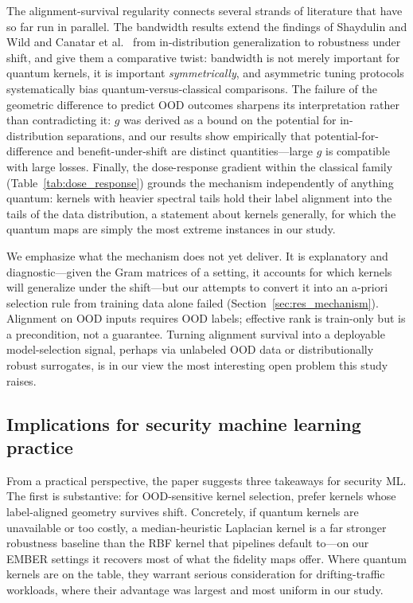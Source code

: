 \documentclass[journal]{IEEEtran}
\begin{document}
The alignment-survival regularity connects several strands of literature that have so far run in parallel. The bandwidth results extend the findings of Shaydulin and Wild \cite{shaydulin2022bandwidth} and Canatar et al.\ \cite{canatar2023bandwidth} from in-distribution generalization to robustness under shift, and give them a comparative twist: bandwidth is not merely important for quantum kernels, it is important \emph{symmetrically}, and asymmetric tuning protocols systematically bias quantum-versus-classical comparisons. The failure of the geometric difference \cite{huang2021powerofdata} to predict OOD outcomes sharpens its interpretation rather than contradicting it: $g$ was derived as a bound on the potential for in-distribution separations, and our results show empirically that potential-for-difference and benefit-under-shift are distinct quantities---large $g$ is compatible with large losses. Finally, the dose-response gradient within the classical family (Table~\ref{tab:dose_response}) grounds the mechanism independently of anything quantum: kernels with heavier spectral tails hold their label alignment into the tails of the data distribution, a statement about kernels generally, for which the quantum maps are simply the most extreme instances in our study.

We emphasize what the mechanism does not yet deliver. It is explanatory and diagnostic---given the Gram matrices of a setting, it accounts for which kernels will generalize under the shift---but our attempts to convert it into an a-priori selection rule from training data alone failed (Section~\ref{sec:res_mechanism}). Alignment on OOD inputs requires OOD labels; effective rank is train-only but is a precondition, not a guarantee. Turning alignment survival into a deployable model-selection signal, perhaps via unlabeled OOD data or distributionally robust surrogates, is in our view the most interesting open problem this study raises.

\subsection{Implications for security machine learning practice}

From a practical perspective, the paper suggests three takeaways for security ML. The first is substantive: for OOD-sensitive kernel selection, prefer kernels whose label-aligned geometry survives shift. Concretely, if quantum kernels are unavailable or too costly, a median-heuristic Laplacian kernel is a far stronger robustness baseline than the RBF kernel that pipelines default to---on our EMBER settings it recovers most of what the fidelity maps offer. Where quantum kernels are on the table, they warrant serious consideration for drifting-traffic workloads, where their advantage was largest and most uniform in our study.
\end{document}
